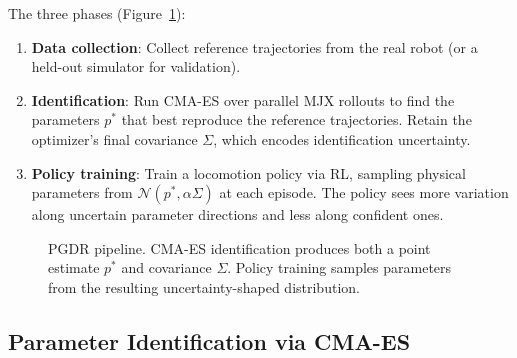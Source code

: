 \documentclass[10pt,twocolumn]{article}
\begin{document}
The three phases (Figure~\ref{fig:pipeline}):
\begin{enumerate}
    \item \textbf{Data collection}: Collect reference trajectories from the real robot (or a held-out simulator for validation).
    \item \textbf{Identification}: Run CMA-ES over parallel MJX rollouts to find the parameters $p^*$ that best reproduce the reference trajectories.  Retain the optimizer's final covariance $\Sigma$, which encodes identification uncertainty.
    \item \textbf{Policy training}: Train a locomotion policy via RL, sampling physical parameters from $\mathcal{N}(p^*, \alpha\Sigma)$ at each episode.  The policy sees more variation along uncertain parameter directions and less along confident ones.
\end{enumerate}

\begin{figure}[t]
\centering
{}
\caption{PGDR pipeline.  CMA-ES identification produces both a point estimate $p^*$ and covariance $\Sigma$.  Policy training samples parameters from the resulting uncertainty-shaped distribution.}
\label{fig:pipeline}
\end{figure}

\subsection{Parameter Identification via CMA-ES}
\end{document}
